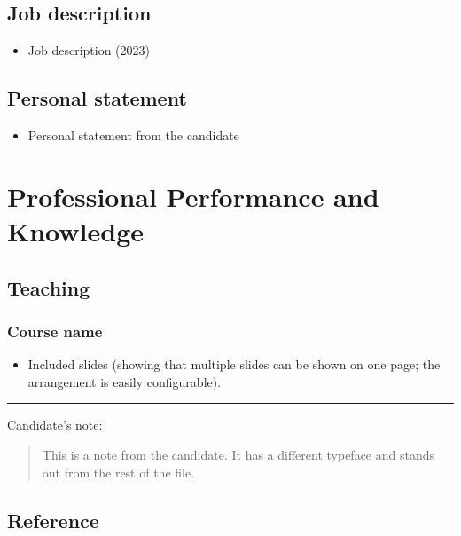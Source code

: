 \documentclass[12pt,oneside]{book}
\newcommand{\candidatenote}[1] {%
\par\noindent\rule{\textwidth}{1pt}
{\large Candidate's note:}
\begin{quote}
  \fontfamily{phv}\selectfont
  {\small #1}
\end{quote}
}
\begin{document}


\section{Job description}

\begin{itemize}
  \item Job description (2023)
\end{itemize}



\section{Personal statement}

\begin{itemize}
  \item Personal statement from the candidate
\end{itemize}



\renewcommand\thechapter{A}
\chapter{Professional Performance and Knowledge}

\section{Teaching}

\subsection{Course name}

\begin{itemize}
  \item Included slides (showing that multiple slides can be shown on one page; the arrangement is easily configurable).
\end{itemize}

\candidatenote{
  This is a note from the candidate.  It has a different typeface and stands out from the rest of the file.
}


\section{Reference}
\end{document}
